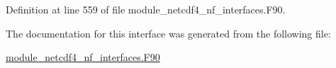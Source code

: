 Definition at line 559 of file module\+\_\+netcdf4\+\_\+nf\+\_\+interfaces.\+F90.



The documentation for this interface was generated from the following file\+:\begin{DoxyCompactItemize}
\item 
\hyperlink{module__netcdf4__nf__interfaces_8F90}{module\+\_\+netcdf4\+\_\+nf\+\_\+interfaces.\+F90}\end{DoxyCompactItemize}
